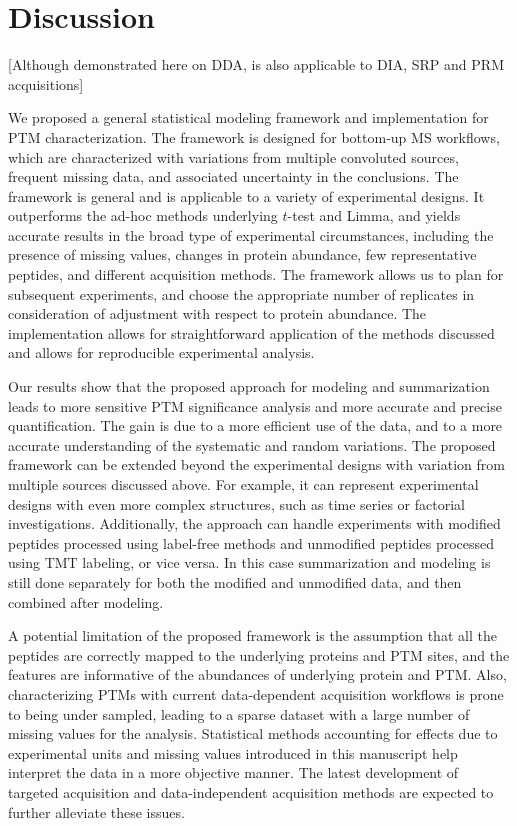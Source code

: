\documentclass[mcp]{article}
\numberwithin{table}{section}
\def\todo#1{{\color{red}[#1]}}
\begin{document}
\section{Discussion}

\todo{Although demonstrated here on DDA, is also applicable to DIA, SRP and PRM acquisitions}

We proposed a general statistical modeling framework and implementation for PTM characterization. The framework is designed for bottom-up MS workflows, which are characterized with variations from multiple convoluted sources, frequent missing data, and associated uncertainty in the conclusions. The framework is general and is applicable to a variety of experimental designs. It outperforms the ad-hoc methods underlying $t$-test and Limma, and yields accurate results in the broad type of experimental circumstances, including the presence of missing values, changes in protein abundance, few representative peptides, and different acquisition methods. The framework allows us to plan for subsequent experiments, and choose the appropriate number of replicates in consideration of adjustment with respect to protein abundance. The implementation allows for straightforward application of the methods discussed and allows for reproducible experimental analysis.

Our results show that the proposed approach for modeling and summarization  leads to more sensitive PTM significance analysis and more accurate and precise quantification. The gain is due to a more efficient use of the data, and to a more accurate understanding of the systematic and random variations. The proposed framework can be extended beyond the experimental designs with variation from multiple sources discussed above. For example, it can represent experimental designs with even more complex structures, such as time series or factorial investigations. Additionally, the approach can handle experiments with modified peptides processed using label-free methods and unmodified peptides processed using TMT labeling, or vice versa. In this case summarization and modeling is still done separately for both the modified and unmodified data, and then combined after modeling.

A potential limitation of the proposed framework is the assumption that all the peptides are correctly mapped to the underlying proteins and PTM sites, and the features are informative of the abundances of underlying protein and PTM. Also, characterizing PTMs with current data-dependent acquisition workflows is prone to being under sampled, leading to a sparse dataset with a large number of missing values for the analysis. Statistical methods accounting for effects due to experimental units and missing values introduced in this manuscript help interpret the data in a more objective manner. The latest development of targeted acquisition and data-independent acquisition methods are expected to further alleviate these issues. 
\end{document}
